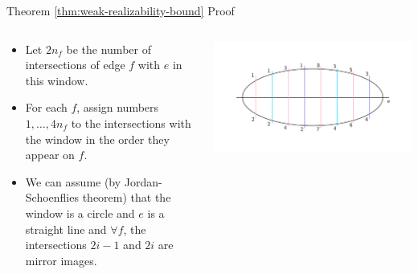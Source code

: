 \documentclass[10pt,aspectratio=169]{beamer}
\theoremstyle{plain}
\begin{document}
\begin{frame}{Theorem \ref{thm:weak-realizability-bound} Proof}
    \begin{columns}
    \begin{column}{0.35\textwidth}
        \begin{itemize}
            \item Let \(2n_f\) be the number of intersections of edge \(f\) with \(e\) in this window.
            \item<2-> For each \(f\), assign numbers \(1, \ldots, 4 n_f\) to the intersections with the window in the order they appear on \(f\).
            \item<3-> We can assume (by Jordan-Schoenflies theorem) that the window is a circle and \(e\) is a straight line and \(\forall f\), the intersections \(2i-1\) and \(2i\) are mirror images.
        \end{itemize}
    \end{column}
    \begin{column}{0.65\textwidth}
        \begin{center}
            \includegraphics[width=\textwidth]{images/figure-5.pdf}
        \end{center}
    \end{column}
    \end{columns}
\end{frame}
\end{document}

